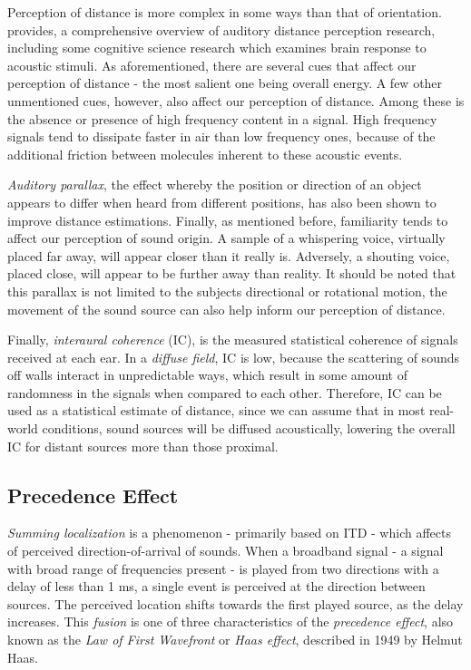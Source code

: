 Perception of distance is more complex in some ways than that of orientation. \cite{zahorik2005auditory} provides, a comprehensive overview of auditory distance perception research, including some cognitive science research which examines brain response to acoustic stimuli. As aforementioned, there are several cues that affect our perception of distance - the most salient one being overall energy. A few other unmentioned cues, however, also affect our perception of distance. Among these is the absence or presence of high frequency content in a signal. High frequency signals tend to dissipate faster in air than low frequency ones, because of the additional friction between molecules inherent to these acoustic events. 

\textit{Auditory parallax}, the effect whereby the position or direction of an object appears to differ when heard from different positions, has also been shown to improve distance estimations. Finally, as mentioned before, familiarity tends to affect our perception of sound origin. A sample of a whispering voice, virtually placed far away, will appear closer than it really is. Adversely, a shouting voice, placed close, will appear to be further away than reality. It should be noted that this parallax is not limited to the subjects directional or rotational motion, the movement of the sound source can also help inform our perception of distance.

Finally, \textit{interaural coherence} (IC), is the measured statistical coherence of signals received at each ear. In a \textit{diffuse field}, IC is low, because the scattering of sounds off walls interact in unpredictable ways, which result in some amount of randomness in the signals when compared to each other. Therefore, IC can be used as a statistical estimate of distance, since we can assume that in most real-world conditions, sound sources will be diffused acoustically, lowering the overall IC for distant sources more than those proximal.

\subsection{Precedence Effect}

\textit{Summing localization} is a phenomenon - primarily based on ITD - which affects of perceived direction-of-arrival of sounds. When a broadband signal - a signal with broad range of frequencies present - is played from two directions with a delay of less than 1 ms, a single event is perceived at the direction between sources. The perceived location shifts towards the first played source, as the delay increases. This \textit{fusion} is one of three characteristics of the \textit{precedence effect}, also known as the \textit{Law of First Wavefront} or \textit{Haas effect}, described in 1949 by Helmut Haas. 

